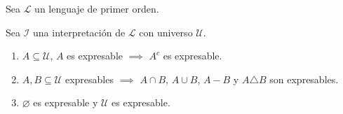 Sea $\mathcal{L}$ un lenguaje de primer orden. 

Sea $\mathcal{I}$ una interpretación de $\mathcal{L}$ con universo
$\mathcal{U}$.

\begin{enumerate}
    \item $A \subseteq \mathcal{U}$, $A$ es expresable $\implies$ $A^c$ es
        expresable.
    \item $A, B \subseteq \mathcal{U}$ expresables $\implies$ $A \cap B$,
        $A \cup B$, $A - B$ y $A \triangle B$ son expresables.
    \item $\varnothing$ es expresable y $\mathcal{U}$ es expresable.
\end{enumerate}

